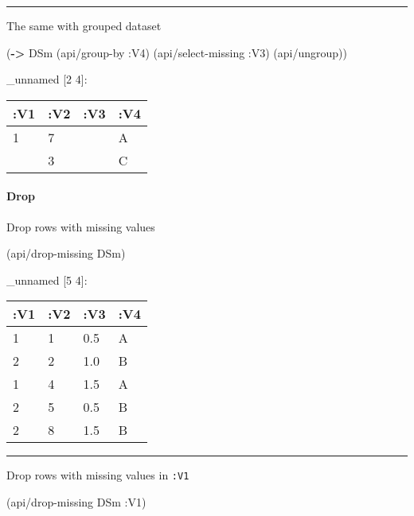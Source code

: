 \documentclass[]{article}
\newenvironment{Shaded}{\begin{snugshade}}{\end{snugshade}}
\newcommand{\AttributeTok}[1]{\textcolor[rgb]{0.77,0.63,0.00}{#1}}
\newcommand{\KeywordTok}[1]{\textcolor[rgb]{0.13,0.29,0.53}{\textbf{#1}}}
\newcommand{\NormalTok}[1]{#1}
\let\oldparagraph\paragraph
\renewcommand{\paragraph}[1]{\oldparagraph{#1}\mbox{}}
\begin{document}
\begin{center}\rule{0.5\linewidth}{0.5pt}\end{center}

The same with grouped dataset

\begin{Shaded}
\begin{Highlighting}[]
\NormalTok{(}\KeywordTok{->}\NormalTok{ DSm}
\NormalTok{    (api/group-by }\AttributeTok{:V4}\NormalTok{)}
\NormalTok{    (api/select-missing }\AttributeTok{:V3}\NormalTok{)}
\NormalTok{    (api/ungroup))}
\end{Highlighting}
\end{Shaded}

\_unnamed {[}2 4{]}:

\begin{longtable}[]{@{}llll@{}}
\toprule
:V1 & :V2 & :V3 & :V4\tabularnewline
\midrule
\endhead
1 & 7 & & A\tabularnewline
& 3 & & C\tabularnewline
\bottomrule
\end{longtable}

\hypertarget{drop-2}{%
\paragraph{Drop}\label{drop-2}}

Drop rows with missing values

\begin{Shaded}
\begin{Highlighting}[]
\NormalTok{(api/drop-missing DSm)}
\end{Highlighting}
\end{Shaded}

\_unnamed {[}5 4{]}:

\begin{longtable}[]{@{}llll@{}}
\toprule
:V1 & :V2 & :V3 & :V4\tabularnewline
\midrule
\endhead
1 & 1 & 0.5 & A\tabularnewline
2 & 2 & 1.0 & B\tabularnewline
1 & 4 & 1.5 & A\tabularnewline
2 & 5 & 0.5 & B\tabularnewline
2 & 8 & 1.5 & B\tabularnewline
\bottomrule
\end{longtable}

\begin{center}\rule{0.5\linewidth}{0.5pt}\end{center}

Drop rows with missing values in \texttt{:V1}

\begin{Shaded}
\begin{Highlighting}[]
\NormalTok{(api/drop-missing DSm }\AttributeTok{:V1}\NormalTok{)}
\end{Highlighting}
\end{Shaded}
\end{document}
